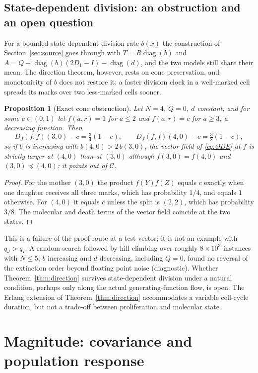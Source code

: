\documentclass[11pt]{article}
\newtheorem{proposition}[theorem]{Proposition}
\theoremstyle{remark}
\newcommand{\diag}{\operatorname{diag}}
\begin{document}
\subsection{State-dependent division: an obstruction and an open question}
\label{sec:statedep}
For a bounded state-dependent division rate $b(x)$ the construction of
Section~\ref{sec:source} goes through with $T=R\diag(b)$ and
$A=Q+\diag(b)(2D_1-I)-\diag(d)$, and the two models still share their mean.
The direction theorem, however, rests on cone preservation, and
monotonicity of $b$ does not restore it: a faster division clock in a
well-marked cell spreads its marks over two less-marked cells sooner.

\begin{proposition}[Exact cone obstruction]\label{prop:obstruction}
Let $N=4$, $Q=0$, $d$ constant, and for some $c\in(0,1)$ let $f(a,r)=1$ for
$a\le2$ and $f(a,r)=c$ for $a\ge3$, a decreasing function. Then
\[
 D_J(f,f)(3,0)-c=\tfrac34(1-c),\qquad D_J(f,f)(4,0)-c=\tfrac38(1-c),
\]
so if $b$ is increasing with $b(4,0)>2\,b(3,0)$, the vector field of
\eqref{eq:ODE} at $f$ is strictly larger at $(4,0)$ than at $(3,0)$ although
$f(3,0)=f(4,0)$ and $(3,0)\preceq(4,0)$: it points out of $\mathcal C$.
\end{proposition}
\begin{proof}
For the mother $(3,0)$ the product $f(Y)f(Z)$ equals $c$ exactly when one
daughter receives all three marks, which has probability $1/4$, and equals
$1$ otherwise. For $(4,0)$ it equals $c$ unless the split is $(2,2)$, which
has probability $3/8$. The molecular and death terms of the vector field
coincide at the two states.
\end{proof}
This is a failure of the proof route at a test vector; it is not an example
with $q_J>q_I$. A random search followed by hill climbing over roughly
$8\times10^3$ instances with $N\le5$, $b$ increasing and $d$ decreasing,
including $Q=0$, found no reversal of the extinction order beyond floating
point noise (diagnostic). Whether Theorem~\ref{thm:direction} survives
state-dependent division under a natural condition, perhaps only along the
actual generating-function flow, is open. The Erlang extension of
Theorem~\ref{thm:direction} accommodates a variable cell-cycle duration, but
not a trade-off between proliferation and molecular state.

\section{Magnitude: covariance and population response}\label{sec:response}
\end{document}
